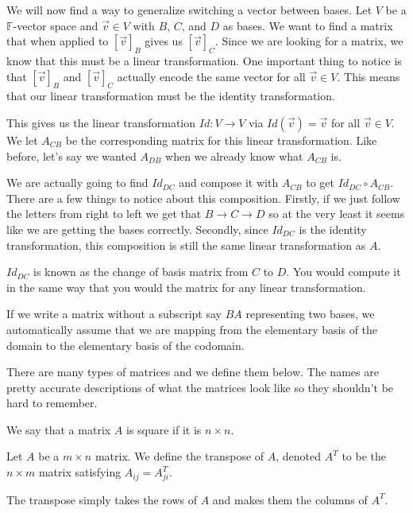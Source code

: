 \begin{example}
    We will now find a way to generalize switching a vector between bases. Let $V$ be a $\mathbb{F}$-vector space and $\vec{v}\in V$ with $B$, $C$, and $D$ as bases. We want to find a matrix that when applied to $[\vec{v}]_B$ gives us $[\vec{v}]_C$. Since we are looking for a matrix, we know that this must be a linear transformation. One important thing to notice is that $[\vec{v}]_B$ and $[\vec{v}]_C$ actually encode the same vector for all $\vec{v}\in V$. This means that our linear transformation must be the identity transformation.

    This gives us the linear transformation $Id:V\to V$ via $Id(\vec{v})=\vec{v}$ for all $\vec{v}\in V$. We let $A_{CB}$ be the corresponding matrix for this linear transformation. Like before, let's say we wanted $A_{DB}$ when we already know what $A_{CB}$ is.

    We are actually going to find $Id_{DC}$ and compose it with $A_{CB}$ to get $Id_{DC}\circ A_{CB}$. There are a few things to notice about this composition. Firstly, if we just follow the letters from right to left we get that $B\to C\to D$ so at the very least it seems like we are getting the bases correctly. Secondly, since $Id_{DC}$ is the identity transformation, this composition is still the same linear transformation as $A$.

    $Id_{DC}$ is known as the change of basis matrix from $C$ to $D$. You would compute it in the same way that you would the matrix for any linear transformation.
\end{example}
\begin{remark}
    If we write a matrix without a subscript say $BA$ representing two bases, we automatically assume that we are mapping from the elementary basis of the domain to the elementary basis of the codomain.
\end{remark}
There are many types of matrices and we define them below. The names are pretty accurate descriptions of what the matrices look like so they shouldn't be hard to remember.
\begin{definition}
    We say that a matrix $A$ is square if it is $n\times n$.
\end{definition}
\begin{definition}
    Let $A$ be a $m\times n$ matrix. We define the transpose of $A$, denoted $A^T$ to be the $n\times m$ matrix satisfying $A_{ij}=A^T_{ji}$.
\end{definition}
\begin{remark}
    The transpose simply takes the rows of $A$ and makes them the columns of $A^T$.
\end{remark}
